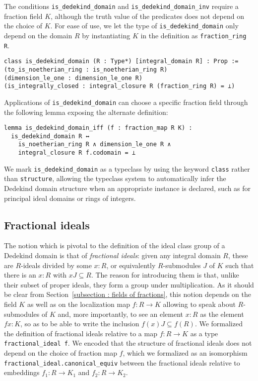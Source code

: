 \documentclass[a4paper,USenglish,cleveref, autoref, thm-restate]{lipics-v2021}
\newcommand{\lean}[1]{\texttt{#1}\xspace} %
\begin{document}
The conditions \lean{is\_dedekind\_domain} and \lean{is\_dedekind\_domain\_inv} require a fraction field $K$,
although the truth value of the predicates does not depend on the choice of $K$.
For ease of use, we let the type of \lean{is\_dedekind\_domain} only depend on the domain $R$
by instantiating $K$ in the definition as \lean{fraction\_ring R}.
\begin{lstlisting}
class is_dedekind_domain (R : Type*) [integral_domain R] : Prop :=
(to_is_noetherian_ring : is_noetherian_ring R)
(dimension_le_one : dimension_le_one R)
(is_integrally_closed : integral_closure R (fraction_ring R) = ⊥)
\end{lstlisting}
Applications of \lean{is\_dedekind\_domain} can choose a specific fraction field through the following lemma exposing the alternate definition:
\begin{lstlisting}
lemma is_dedekind_domain_iff (f : fraction_map R K) :
  is_dedekind_domain R ↔
    is_noetherian_ring R ∧ dimension_le_one R ∧
    integral_closure R f.codomain = ⊥
\end{lstlisting}

We mark \lean{is\_dedekind\_domain} as a typeclass by using the keyword \lean{class} rather than \lean{structure},
allowing the typeclass system to automatically infer the Dedekind domain structure when an appropriate instance is declared,
such as for principal ideal domains or rings of integers.

\subsection{Fractional ideals}\label{subsection:frac_ideals}
The notion which is pivotal to the definition of the ideal class group of a Dedekind domain is that of \emph{fractional ideals}: given any integral domain $R$, these are $R$-ideals divided by some $x : R$,
or equivalently $R$-submodules $J$ of $K$ such that there is an $x : R$ with $x J \subseteq R$. The reason for introducing them is that, unlike their subset of proper ideals, they form a group under multiplication. As it should be clear from Section~\ref{subsection : fields of fractions}, this notion depends on the field $K$ as well as on the localization map $f\colon R\to K$ allowing to speak about $R$-submodules of $K$ and, more importantly, to see an element $x:R$ as the element $f x : K$, so as to be able to write the inclusion $f(x)J\subseteq f(R)$. We formalized the definition of fractional ideals relative to a map $f\colon R\to K$ as a type \lean{fractional\_ideal f}. 
We encoded that the structure of fractional ideals does not depend on the choice of fraction map $f$,
which we formalized as an isomorphism \lean{fractional\_ideal.canonical\_equiv} between the fractional ideals relative to embeddings $f_1\colon R\to K_1$ and $f_2\colon R\to K_2$.
\end{document}
